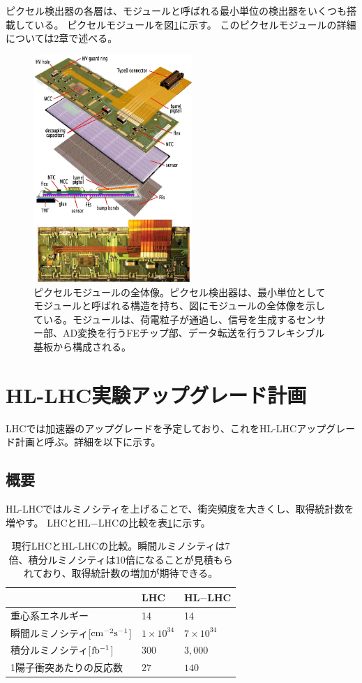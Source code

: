 ピクセル検出器の各層は、モジュールと呼ばれる最小単位の検出器をいくつも搭載している。
ピクセルモジュールを図\ref{pixel_detector}に示す。
このピクセルモジュールの詳細については2章で述べる。
\begin{figure}[bpt]\centering
\includegraphics[width=6cm]{./pixel_detector.png}
\caption[ピクセルモジュールの全体像。]{ピクセルモジュールの全体像\cite{1-2}。ピクセル検出器は、最小単位としてモジュールと呼ばれる構造を持ち、図にモジュールの全体像を示している。モジュールは、荷電粒子が通過し、信号を生成するセンサー部、AD変換を行うFEチップ部、データ転送を行うフレキシブル基板から構成される。}
\label{pixel_detector}
\end{figure}


\clearpage
\section{HL-LHC実験アップグレード計画}
LHCでは加速器のアップグレードを予定しており、これをHL-LHCアップグレード計画と呼ぶ。詳細を以下に示す。
\subsection{概要}
HL-LHCではルミノシティ\cite{1-13}を上げることで、衝突頻度を大きくし、取得統計数を増やす。
LHCとHL$-$LHCの比較を表\ref{compare_lhc}に示す。

\begin{table}[tbp]
\begin{center}
\caption[現行LHCとHL-LHCの比較]{現行LHCとHL-LHCの比較\cite{1-6}。瞬間ルミノシティは7倍、積分ルミノシティは10倍になることが見積もられており、取得統計数の増加が期待できる。}
\label{compare_lhc}
  \begin{tabular}{|lll|} \hline
    & LHC & HL$-$LHC \\ \hline
    重心系エネルギー & 14 & 14 \\
    瞬間ルミノシティ[$\rm{cm^{-2}s^{-1}}$] & $1\times 10^{34}$ & $7\times10^{34}$ \\
    積分ルミノシティ[$\rm{fb^{-1}}$] & $300$ & $3,000$ \\
    1陽子衝突あたりの反応数 & $27$ & $140$ \\ \hline 
  \end{tabular}
\end{center}
\end{table}

